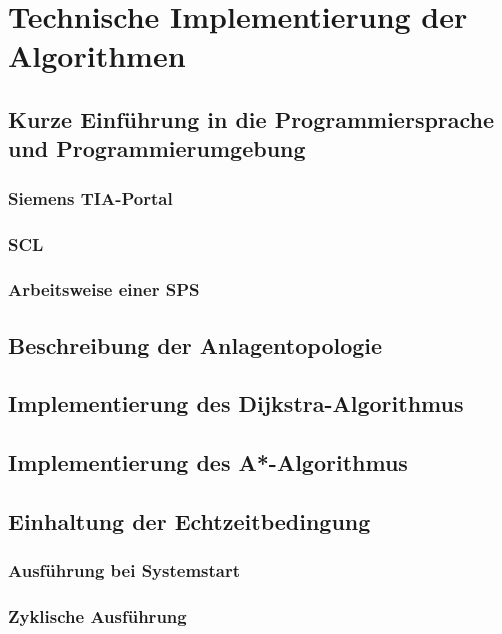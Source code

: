 \chapter{Technische Implementierung der Algorithmen}

\section{Kurze Einführung in die Programmiersprache und Programmierumgebung}

\subsection{Siemens TIA-Portal}

\subsection{SCL}

\subsection{Arbeitsweise einer SPS}

\section{Beschreibung der Anlagentopologie}

\section{Implementierung des Dijkstra-Algorithmus}

\section{Implementierung des A*-Algorithmus}

\section{Einhaltung der Echtzeitbedingung}

\subsection{Ausführung bei Systemstart}

\subsection{Zyklische Ausführung}